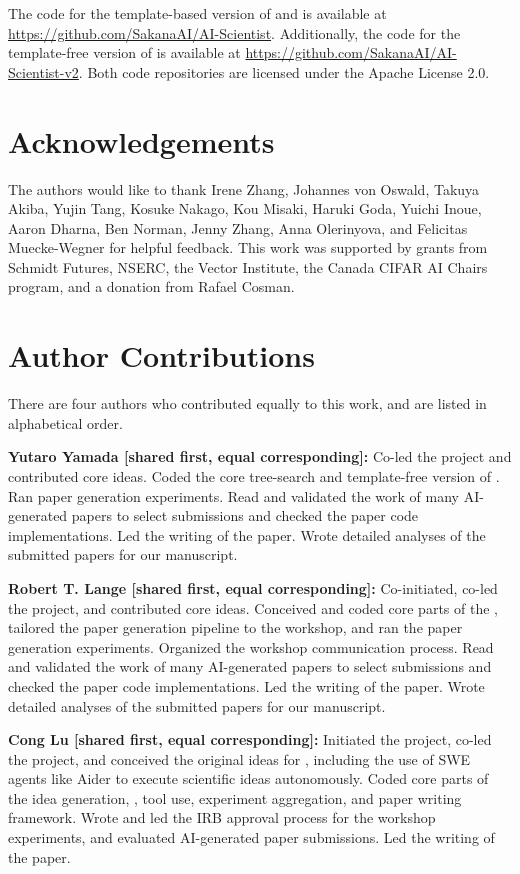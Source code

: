 The code for the template-based version of \ouralgo and \ourreviewer is available at \url{https://github.com/SakanaAI/AI-Scientist}.
Additionally, the code for the template-free version of \ouralgo is available at \url{https://github.com/SakanaAI/AI-Scientist-v2}.
Both code repositories are licensed under the Apache License 2.0.


\section*{Acknowledgements}
The authors would like to thank Irene Zhang, Johannes von Oswald, Takuya Akiba, Yujin Tang, Kosuke Nakago, Kou Misaki, Haruki Goda, Yuichi Inoue, Aaron Dharna, Ben Norman, Jenny Zhang, Anna Olerinyova, and Felicitas Muecke-Wegner for helpful feedback.
This work was supported by grants from Schmidt Futures, NSERC, the Vector Institute, the Canada CIFAR AI Chairs program, and a donation from Rafael Cosman.

\section*{Author Contributions}

There are four authors who contributed equally to this work, and are listed in alphabetical order.

\textbf{Yutaro Yamada [shared first, equal corresponding]:} Co-led the project and contributed core ideas. Coded the core tree-search and template-free version of \ouralgo. Ran paper generation experiments. Read and validated the work of many AI-generated papers to select submissions and checked the paper code implementations. Led the writing of the paper. Wrote detailed analyses of the submitted papers for our manuscript.

\textbf{Robert T. Lange [shared first, equal corresponding]:} Co-initiated, co-led the project, and contributed core ideas. Conceived and coded core parts of the \ourreviewer, tailored the paper generation pipeline to the workshop, and ran the paper generation experiments. Organized the workshop communication process. Read and validated the work of many AI-generated papers to select submissions and checked the paper code implementations. Led the writing of the paper. Wrote detailed analyses of the submitted papers for our manuscript.

\textbf{Cong Lu [shared first, equal corresponding]:} Initiated the project, co-led the project, and conceived the original ideas for \ouralgo, including the use of SWE agents like Aider to execute scientific ideas autonomously. Coded core parts of the idea generation, \ourreviewer, tool use, experiment aggregation, and paper writing framework. Wrote and led the IRB approval process for the workshop experiments, and evaluated AI-generated paper submissions. Led the writing of the paper.

